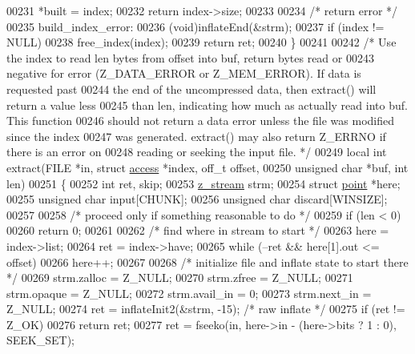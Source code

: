 \begin{DoxyCode}
00231     *built = index;
00232     \textcolor{keywordflow}{return} index->size;
00233 
00234     \textcolor{comment}{/* return error */}
00235   build\_index\_error:
00236     (void)inflateEnd(&strm);
00237     \textcolor{keywordflow}{if} (index != NULL)
00238         free\_index(index);
00239     \textcolor{keywordflow}{return} ret;
00240 \}
00241 
00242 \textcolor{comment}{/* Use the index to read len bytes from offset into buf, return bytes read or}
00243 \textcolor{comment}{   negative for error (Z\_DATA\_ERROR or Z\_MEM\_ERROR).  If data is requested past}
00244 \textcolor{comment}{   the end of the uncompressed data, then extract() will return a value less}
00245 \textcolor{comment}{   than len, indicating how much as actually read into buf.  This function}
00246 \textcolor{comment}{   should not return a data error unless the file was modified since the index}
00247 \textcolor{comment}{   was generated.  extract() may also return Z\_ERRNO if there is an error on}
00248 \textcolor{comment}{   reading or seeking the input file. */}
00249 local \textcolor{keywordtype}{int} extract(FILE *in, \textcolor{keyword}{struct} \hyperlink{structaccess}{access} *index, off\_t offset,
00250                   \textcolor{keywordtype}{unsigned} \textcolor{keywordtype}{char} *buf, \textcolor{keywordtype}{int} len)
00251 \{
00252     \textcolor{keywordtype}{int} ret, skip;
00253     \hyperlink{structz__stream__s}{z\_stream} strm;
00254     \textcolor{keyword}{struct }\hyperlink{structpoint}{point} *here;
00255     \textcolor{keywordtype}{unsigned} \textcolor{keywordtype}{char} input[CHUNK];
00256     \textcolor{keywordtype}{unsigned} \textcolor{keywordtype}{char} discard[WINSIZE];
00257 
00258     \textcolor{comment}{/* proceed only if something reasonable to do */}
00259     \textcolor{keywordflow}{if} (len < 0)
00260         \textcolor{keywordflow}{return} 0;
00261 
00262     \textcolor{comment}{/* find where in stream to start */}
00263     here = index->list;
00264     ret = index->have;
00265     \textcolor{keywordflow}{while} (--ret && here[1].out <= offset)
00266         here++;
00267 
00268     \textcolor{comment}{/* initialize file and inflate state to start there */}
00269     strm.zalloc = Z\_NULL;
00270     strm.zfree = Z\_NULL;
00271     strm.opaque = Z\_NULL;
00272     strm.avail\_in = 0;
00273     strm.next\_in = Z\_NULL;
00274     ret = inflateInit2(&strm, -15);         \textcolor{comment}{/* raw inflate */}
00275     \textcolor{keywordflow}{if} (ret != Z\_OK)
00276         \textcolor{keywordflow}{return} ret;
00277     ret = fseeko(in, here->in - (here->bits ? 1 : 0), SEEK\_SET);

\end{DoxyCode}
